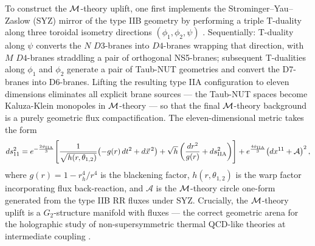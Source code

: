 \documentclass[a4paper,11pt,fleqn]{article}
\theoremstyle{plain}
\theoremstyle{definition}
\begin{document}
To construct the ${\cal M}$-theory uplift, one first implements the Strominger--Yau--Zaslow (SYZ)
mirror of the type IIB geometry by performing a triple T-duality along three toroidal
isometry directions $(\phi_1, \phi_2, \psi)$ \cite{NPB,MQGP}.
Sequentially: T-duality along $\psi$ converts the $N$ $D3$-branes into $D4$-branes wrapping
that direction, with $M$ $D4$-branes straddling a pair of orthogonal NS5-branes; subsequent
T-dualities along $\phi_1$ and $\phi_2$ generate a pair of Taub-NUT geometries and convert
the D7-branes into D6-branes. Lifting the resulting type IIA configuration to eleven
dimensions eliminates all explicit brane sources --- the Taub-NUT spaces become
Kaluza-Klein monopoles in ${\cal M}$-theory --- so that the final ${\cal M}$-theory background is a purely
geometric flux compactification. The eleven-dimensional metric takes the form
\begin{equation}
ds^2_{11} = e^{-\frac{2\phi_{\rm IIA}}{3}}\!\left[
  \frac{1}{\sqrt{h(r,\theta_{1,2})}}\!\left(-g(r)\,dt^2 + d\vec{x}^{\,2}\right)
  + \sqrt{h}\left(\frac{dr^2}{g(r)} + ds^2_{\rm IIA}\right)\right]
  + e^{\frac{4\phi_{\rm IIA}}{3}}\!\left(dx^{11} + \mathcal{A}\right)^2,
\label{eq:11dmetric}
\end{equation}
where $g(r) = 1 - r_h^4/r^4$ is the blackening factor, $h(r,\theta_{1,2})$ is the warp
factor incorporating flux back-reaction, and $\mathcal{A}$ is the ${\cal M}$-theory circle one-form
generated from the type IIB RR fluxes under SYZ. Crucially, the ${\cal M}$-theory uplift is a
$G_2$-structure manifold with fluxes --- the correct geometric arena for the holographic
study of non-supersymmetric thermal QCD-like theories at intermediate coupling
\cite{House:2004pm,Dall'Agata:2005ff,Grana:2005jc}.
\end{document}
